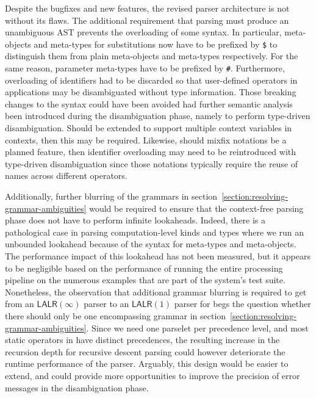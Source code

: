 Despite the bugfixes and new features, the revised parser architecture is not without its flaws.
The additional requirement that parsing must produce an unambiguous \ac{AST} prevents the overloading of some syntax.
In particular, meta-objects and meta-types for substitutions now have to be prefixed by \texttt{\$} to distinguish them from plain meta-objects and meta-types respectively.
For the same reason, parameter meta-types have to be prefixed by \texttt{\#}.
Furthermore, overloading of identifiers had to be discarded so that user-defined operators in applications may be disambiguated without type information.
Those breaking changes to the syntax could have been avoided had further semantic analysis been introduced during the disambiguation phase, namely to perform type-driven disambiguation.
Should \Beluga be extended to support multiple context variables in contexts, then this may be required.
Likewise, should mixfix notations be a planned feature, then identifier overloading may need to be reintroduced with type-driven disambiguation since those notations typically require the reuse of names across different operators.

Additionally, further blurring of the grammars in section~\ref{section:resolving-grammar-ambiguities} would be required to ensure that the context-free parsing phase does not have to perform infinite lookaheads.
Indeed, there is a pathological case in parsing computation-level kinds and types where we run an unbounded lookahead because of the syntax for meta-types and meta-objects.
The performance impact of this lookahead has not been measured, but it appears to be negligible based on the performance of running the entire processing pipeline on the numerous examples that are part of the system's test suite.
Nonetheless, the observation that additional grammar blurring is required to get from an $ \mathsf{LALR}(\infty) $ parser to an $ \mathsf{LALR}(1) $ parser for \Beluga begs the question whether there should only be one encompassing grammar in section~\ref{section:resolving-grammar-ambiguities}.
Since we need one parselet per precedence level, and most static operators in \Beluga have distinct precedences, the resulting increase in the recursion depth for recursive descent parsing could however deteriorate the runtime performance of the parser.
Arguably, this design would be easier to extend, and could provide more opportunities to improve the precision of error messages in the disambiguation phase.
